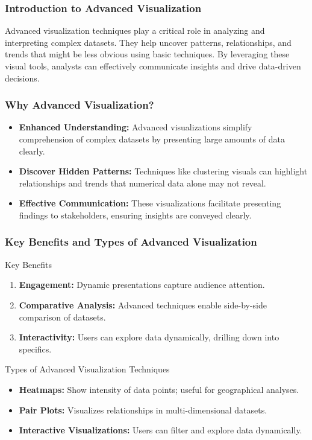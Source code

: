 \documentclass[aspectratio=169]{beamer}
\begin{document}
\begin{frame}[fragile]
    \frametitle{Introduction to Advanced Visualization}
    Advanced visualization techniques play a critical role in analyzing and interpreting complex datasets. 
    They help uncover patterns, relationships, and trends that might be less obvious using basic techniques. 
    By leveraging these visual tools, analysts can effectively communicate insights and drive data-driven decisions.
\end{frame}

\begin{frame}[fragile]
    \frametitle{Why Advanced Visualization?}
    \begin{itemize}
        \item \textbf{Enhanced Understanding:} 
        Advanced visualizations simplify comprehension of complex datasets by presenting large amounts of data clearly.
        
        \item \textbf{Discover Hidden Patterns:} 
        Techniques like clustering visuals can highlight relationships and trends that numerical data alone may not reveal.
        
        \item \textbf{Effective Communication:} 
        These visualizations facilitate presenting findings to stakeholders, ensuring insights are conveyed clearly.
    \end{itemize}
\end{frame}

\begin{frame}[fragile]
    \frametitle{Key Benefits and Types of Advanced Visualization}
    \begin{block}{Key Benefits}
        \begin{enumerate}
            \item \textbf{Engagement:} Dynamic presentations capture audience attention.
            \item \textbf{Comparative Analysis:} Advanced techniques enable side-by-side comparison of datasets.
            \item \textbf{Interactivity:} Users can explore data dynamically, drilling down into specifics.
        \end{enumerate}
    \end{block}

    \begin{block}{Types of Advanced Visualization Techniques}
        \begin{itemize}
            \item \textbf{Heatmaps:} Show intensity of data points; useful for geographical analyses.
            \item \textbf{Pair Plots:} Visualizes relationships in multi-dimensional datasets.
            \item \textbf{Interactive Visualizations:} Users can filter and explore data dynamically.
        \end{itemize}
    \end{block}
\end{frame}
\end{document}

